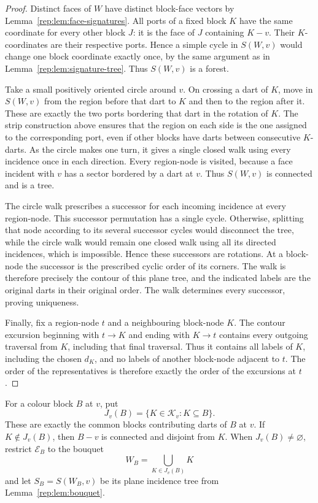 \begin{proof}
Distinct faces of $W$ have distinct block-face vectors by
Lemma~\ref{rep:lem:face-signatures}.  All ports of a fixed block $K$ have the
same coordinate for every other block $J$: it is the face of $J$ containing
$K-v$.  Their $K$-coordinates are their respective ports.  Hence a simple
cycle in $S(W,v)$ would change one block coordinate exactly once, by the
same argument as in Lemma~\ref{rep:lem:signature-tree}.  Thus $S(W,v)$ is a
forest.

Take a small positively oriented circle around $v$.  On crossing a dart of
$K$, move in $S(W,v)$ from the region before that dart to $K$ and then to the
region after it.  These are exactly the two ports bordering that dart in
the rotation of $K$.  The strip construction above ensures that the region
on each side is the one assigned to the corresponding port, even if other
blocks have darts between consecutive $K$-darts.  As the circle makes one
turn, it gives a single closed walk using every incidence once in each
direction.  Every region-node is visited, because a face incident with $v$
has a sector bordered by a dart at $v$.  Thus $S(W,v)$ is connected and is
a tree.

The circle walk prescribes a successor for each incoming incidence at every
region-node.  This successor permutation has a single cycle.  Otherwise,
splitting that node according to its several successor cycles would
disconnect the tree, while the circle walk would remain one closed walk
using all its directed incidences, which is impossible.  Hence these
successors are rotations.  At a block-node the successor is the prescribed
cyclic order of its corners.  The walk is therefore precisely the contour
of this plane tree, and the indicated labels are the original darts in
their original order.  The walk determines every successor, proving
uniqueness.

Finally, fix a region-node $t$ and a neighbouring block-node $K$.  The contour
excursion beginning with $t\to K$ and ending with $K\to t$ contains every
outgoing traversal from $K$, including that final traversal.  Thus it
contains all labels of $K$, including the chosen $d_K$, and no labels of
another block-node adjacent to $t$.  The order of the representatives is
therefore exactly the order of the excursions at $t$.
\end{proof}

For a colour block $B$ at $v$, put
\[
 J_v(B)=\{K\in\mathcal K_v:K\subseteq B\}.
\]
These are exactly the common blocks contributing darts of $B$ at $v$.
If $K\notin J_v(B)$, then $B-v$ is connected and disjoint from $K$.
When $J_v(B)\ne\varnothing$, restrict $\mathcal E_B$ to the bouquet
\[
 W_B=\bigcup_{K\in J_v(B)}K
\]
and let $S_B=S(W_B,v)$ be its plane incidence tree from
Lemma~\ref{rep:lem:bouquet}.


